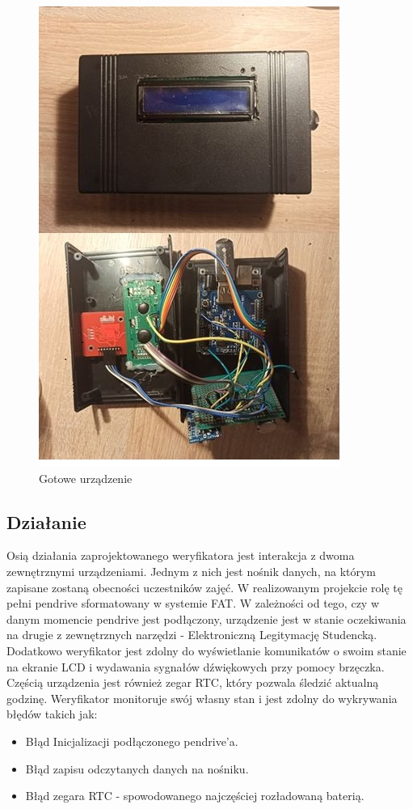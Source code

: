 \documentclass[declaration,shortabstract, mgr]{iithesis}
\begin{document}
\begin{figure}[h]
\caption{Gotowe urządzenie}
\centering
\includegraphics{arduino1.jpg}
\end{figure}
\subsection{Działanie}
\indent Osią działania zaprojektowanego weryfikatora jest interakcja z dwoma zewnętrznymi urządzeniami. Jednym z nich jest nośnik danych, na którym zapisane zostaną obecności uczestników zajęć. W realizowanym projekcie rolę tę pełni pendrive sformatowany w systemie FAT. W zależności od tego, czy w danym momencie pendrive jest podłączony, urządzenie jest w stanie oczekiwania na drugie z zewnętrznych narzędzi - Elektroniczną Legitymację Studencką. Dodatkowo weryfikator jest zdolny do wyświetlanie komunikatów o swoim stanie na ekranie LCD i wydawania sygnałów dźwiękowych przy pomocy brzęczka. Częścią urządzenia jest również zegar RTC, który pozwala śledzić aktualną godzinę. Weryfikator monitoruje swój własny stan i jest zdolny do wykrywania błędów takich jak:
\begin{itemize}
\item Błąd Inicjalizacji podłączonego pendrive'a.
\item Błąd zapisu odczytanych danych na nośniku.
\item Błąd zegara RTC - spowodowanego najczęściej rozładowaną baterią.
\end{itemize}
\end{document}
